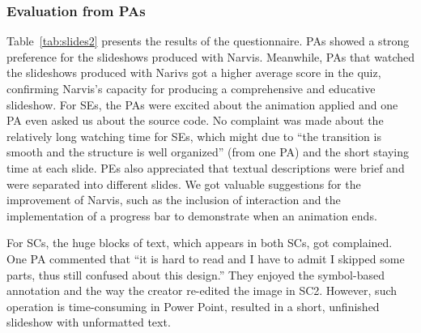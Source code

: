 

\subsubsection{Evaluation from PAs}

Table~\ref{tab:slides2}  presents the results of the questionnaire. PAs showed a strong preference for the slideshows produced with Narvis. Meanwhile,  PAs that watched the slideshows produced with Narivs got a higher average score in the quiz, confirming Narvis's capacity for producing a comprehensive and educative  slideshow. 
For SEs, the PAs were excited about the animation applied and one PA even asked us about the source code. No complaint was made about the relatively long watching time for SEs, which might due to ``the transition is smooth and the structure is well organized'' (from one PA) and the short staying time at each slide. PEs also appreciated that textual descriptions were brief and were separated into different slides.
We got valuable suggestions for the improvement of Narvis, such as the inclusion of interaction and the implementation of a progress bar to demonstrate when an animation ends. 

For SCs, the huge blocks of text, which appears in both SCs, got   complained. 
One PA commented that ``it is hard to read and I have to admit I skipped some parts, thus still confused about this design.'' They enjoyed the symbol-based annotation and the way the creator re-edited the image in SC2. However, such operation is time-consuming in Power Point, resulted in a short, unfinished slideshow with unformatted text. 


